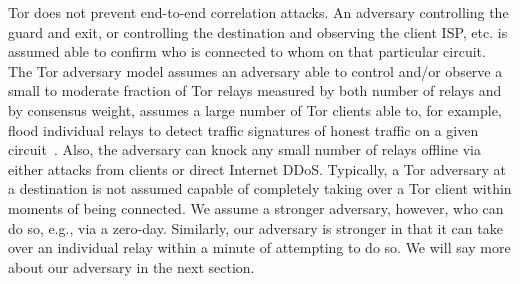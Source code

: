 Tor does not prevent end-to-end correlation attacks. An adversary
controlling the guard and exit, or controlling the destination and
observing the client ISP, etc. is assumed able to confirm who is
connected to whom on that particular circuit. The Tor adversary model
assumes an adversary able to control and/or observe a small to
moderate fraction of Tor relays measured by both number of relays and
by consensus weight, assumes a large number of Tor clients able to,
for example, flood individual relays to detect traffic signatures of
honest traffic on a given circuit~\cite{long-paths}. Also, the
adversary can knock any small number of relays offline via either
attacks from clients or direct Internet DDoS\@. Typically, a
Tor adversary at a destination is not assumed capable of completely
taking over a Tor client within moments of being connected. We
assume a stronger adversary, however, who can do so, e.g., via a zero-day.
Similarly, our adversary is stronger in that it can take over
an individual relay within a minute of attempting to do so. We will say
more about our adversary in the next section.




